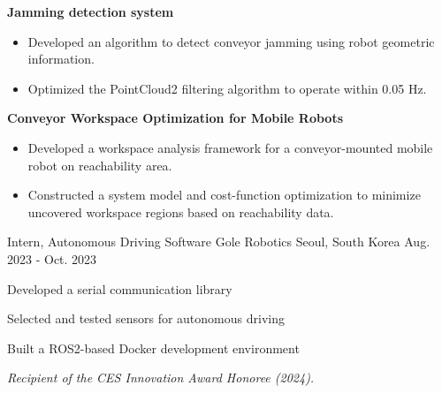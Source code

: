 \begin{cventries}
{\begin{cvitems}
{\begin{itemize}[leftmargin=2ex, nosep, noitemsep]
          \end{itemize}
        }
        \item {\textbf{Jamming detection system}
          \begin{itemize}[leftmargin=2ex, nosep, noitemsep]
            \setlength{\parskip}{0pt}
            \renewcommand{\labelitemi}{\bullet}
            \item {Developed an algorithm to detect conveyor jamming using robot geometric information.}
            \item {Optimized the PointCloud2 filtering algorithm to operate within 0.05 Hz.}
          \end{itemize}
        }
        \item {\textbf{Conveyor Workspace Optimization for Mobile Robots}
          \begin{itemize}[leftmargin=2ex, nosep, noitemsep]
            \item {Developed a workspace analysis framework for a conveyor-mounted mobile robot on reachability area.}
            \item {Constructed a system model and cost-function optimization to minimize uncovered workspace regions based on reachability data.}
          \end{itemize}
        }
      \end{cvitems}
    }

  \cventry
    {Intern, Autonomous Driving Software} %
    {Gole Robotics} %
    {Seoul, South Korea} %
    {Aug. 2023 - Oct. 2023} %
    {
      \begin{cvitems} %
        \item {Developed a serial communication library}
        \item {Selected and tested sensors for autonomous driving}
        \item {Built a ROS2-based Docker development environment}
        \item {\textit{Recipient of the CES Innovation Award Honoree (2024).}}
      \end{cvitems}
    }


\end{cventries}
